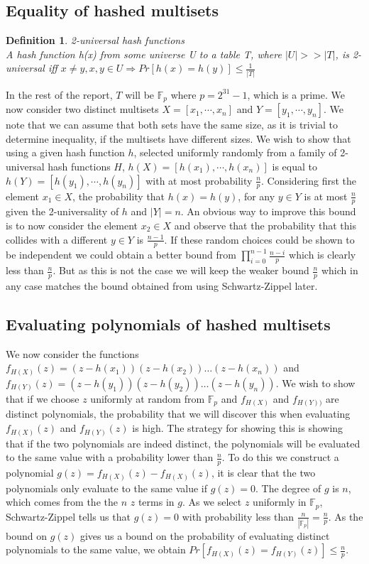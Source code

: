 \documentclass[article,a4paper,oneside]{article}
\newtheorem{definition}{Definition}
\newcommand{\+}[1]{\ensuremath{\boldsymbol{#1}}}
\begin{document}
\subsection*{Equality of hashed multisets}
\begin{definition}{2-universal hash functions}\\
A hash function h(x) from some universe \emph{U} to a table {T}, where $|U| >> |T|$, is 2\emph{-}universal iff $x \neq y, x,y \in U \Rightarrow Pr[h(x) = h(y)] \leq \frac{1}{|T|}$
\end{definition}
In the rest of the report, $T$ will be $\mathbb{F}_p$ where $p = 2^{31} - 1$, which is a prime.
We now consider two distinct multisets $X = \left[x_1,\cdots, x_n\right]$ and $Y = \left[y_1, \cdots, y_n\right]$. We note that we can assume that both sets have the same size, as it is trivial to determine inequality, if the multisets have different sizes.
We wish to show that using a given hash function $h$, selected uniformly randomly from a family of 2-universal hash functions $H$, $h(X) = \left[h(x_1),\cdots, h(x_n)\right]$ is equal to $h(Y) = \left[h(y_1),\cdots,h(y_n)\right]$ with at most probability $\frac{n}{p}$.
Considering first the element $x_1 \in X$, the probability that $h(x) = h(y)$, for any $y \in Y$ is at most $\frac{n}{p}$ given the 2-universality of $h$ and $|Y| = n$.
An obvious way to improve this bound is to now consider the element $x_2 \in X$ and observe that the probability that this collides with a different $y \in Y$ is $\frac{n-1}{p}$. If these random choices could be shown to be independent we could obtain a better bound from $\prod_{i=0}^{n-1}\frac{n-i}{p}$ which is clearly less than $\frac{n}{p}$. But as this is not the case we will keep the weaker bound $\frac{n}{p}$ which in any case matches the bound obtained from using Schwartz-Zippel later.
\subsection*{Evaluating polynomials of hashed multisets}
We now consider the functions $f_{H(X)}(z) = (z-h(x_1))(z-h(x_2))\ldots(z - h(x_n))$ and $f_{H(Y)}(z) = (z-h(y_1))(z-h(y_2))\ldots(z - h(y_n))$.
We wish to show that if we choose $z$ uniformly at random from $\mathbb{F}_p$ and $f_{H(X)}$ and $f_{H(Y))}$ are distinct polynomials, the probability that we will discover this when evaluating $f_{H(X)}(z)$ and $f_{H(Y)}(z)$ is high. The strategy for showing this is showing that if the two polynomials are indeed distinct, the polynomials will be evaluated to the same value with a probability lower than $\frac{n}{p}$.
To do this we construct a polynomial $g(z) = f_{H(X)}(z) - f_{H(X)}(z)$, it is clear that the two polynomials only evaluate to the same value if $g(z) = 0$. The degree of $g$ is $n$, which comes from the the $n$ $z$ terms in $g$.
As we select $z$ uniformly in $\mathbb{F}_p$, Schwartz-Zippel tells us that $g(z) = 0$ with probability less than $\frac{n}{|\mathbb{F}_p|} = \frac{n}{p}$. As the bound on $g(z)$ gives us a bound on the probability of evaluating distinct polynomials to the same value, we obtain $Pr[f_{H(X)}(z) = f_{H(Y)}(z)] \leq \frac{n}{p}$.
\end{document}
